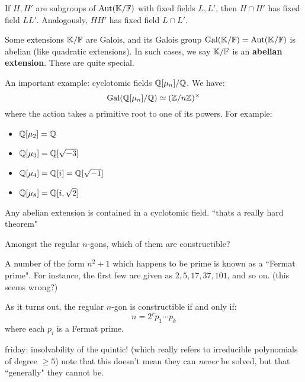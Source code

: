 If $ H, H' $ are subgroups of $ \operatorname{Aut}(\mathbb{K}/\mathbb{F}) $ with fixed fields $ L, L' $,
then $ H \cap H' $ has fixed field $ LL' $. Analogously, $ HH' $ has fixed field
$ L \cap L' $.

Some extensions $ \mathbb{K}/\mathbb{F} $ are Galois, and its Galois group $ \operatorname{Gal}(\mathbb{K}/\mathbb{F}) =
\operatorname{Aut}(\mathbb{K}/\mathbb{F}) $ is abelian (like quadratic extensions).
In such cases, we say $ \mathbb{K}/\mathbb{F} $ is an \textbf{abelian extension}.
These are quite special.

\begin{xmp}[source=Primary Source Material]
    An important example: cyclotomic fields $ \mathbb{Q}[\mu_{n}]/\mathbb{Q} $. We have:
    \begin{equation*}
        \operatorname{Gal}(\mathbb{Q}[\mu_{n}]/\mathbb{Q}) \simeq (\mathbb{Z}/n\mathbb{Z})^{\times}
    \end{equation*}
    where the action takes a primitive root to one of its powers. For example:
    \begin{itemize}
        \item $ \mathbb{Q}[\mu_{2}] = \mathbb{Q} $
        \item $ \mathbb{Q}[\mu_{3}] = \mathbb{Q}[\sqrt{-3}] $
        \item $ \mathbb{Q}[\mu_{4}] = \mathbb{Q}[i] = \mathbb{Q}[\sqrt{-1}] $
        \item $ \mathbb{Q}[\mu_{8}] = \mathbb{Q}[i, \sqrt{2}] $
    \end{itemize}
\end{xmp}

\begin{thm}[title=Kronecker-Weber Theorem]
    Any abelian extension is contained in a cyclotomic field.
    ``thats a really hard theorem"
\end{thm}
Amongst the regular $ n $-gons, which of them are constructible?

A number of the form $ n^{2}+1 $ which happens to be prime is known as a
``Fermat prime". For instance, the first few are given as $ 2, 5, 17, 37, 101 $,
and so on. (this seems wrong?)

As it turns out, the regular $ n $-gon is constructible if and only if:
\begin{equation*}
    n = 2^{r}p_{1}\cdots p_{k}
\end{equation*}
where each $ p_{i} $ is a Fermat prime.

friday: insolvability of the quintic! (which really refers to irreducible
polynomials of degree $ \geq 5 $) note that this doesn't mean they can
\textit{never} be solved, but that ``generally" they cannot be.


